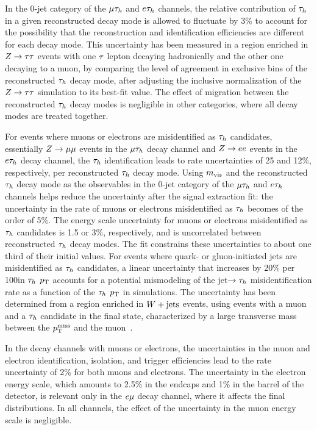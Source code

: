 In the 0-jet category of the $\mu\tau_{h}$ and $e\tau_{h}$ channels, the relative contribution of $\tau_{h}$ in a given
reconstructed decay mode is allowed to fluctuate by 3\% to account for the possibility that the reconstruction and
identification efficiencies are different for each decay mode. This uncertainty has been measured in a region enriched in $Z\to\tau\tau$ events with one $\tau$ lepton decaying hadronically and the other one decaying to a muon, by comparing the level of agreement in exclusive bins of the reconstructed $\tau_{h}$ decay mode, after adjusting the inclusive normalization of the $Z\to\tau\tau$ simulation to its best-fit value. The effect of migration between the reconstructed $\tau_{h}$ decay modes is negligible in other categories, where
all decay modes are treated together.

For events where muons or electrons are misidentified as $\tau_{h}$ candidates, essentially $Z\to \mu\mu$ events in the $\mu\tau_{h}$ decay channel and $Z\to ee$ events in the $e\tau_{h}$ decay channel, the $\tau_{h}$ identification leads to rate uncertainties of 25 and 12\%, respectively, per reconstructed $\tau_{h}$ decay mode. Using $m_\text{vis}$ and the reconstructed $\tau_{h}$ decay mode as the observables in the 0-jet category of the $\mu\tau_{h}$ and $e\tau_{h}$ channels helps reduce the uncertainty after the signal extraction fit: the uncertainty in the rate of muons or electrons misidentified as $\tau_{h}$ becomes of the order of 5\%. The energy scale uncertainty for muons or electrons
 misidentified as $\tau_{h}$ candidates is 1.5 or 3\%, respectively, and is uncorrelated between reconstructed $\tau_{h}$ decay
modes. The fit constrains these uncertainties to about one third of their initial values. For events where quark- or gluon-initiated jets are misidentified as $\tau_{h}$ candidates, a linear uncertainty that increases by 20\% per 100\GeV in $\tau_{h}$ $p_\mathrm{T}$ accounts for a potential mismodeling of the jet$\to\tau_{h}$ misidentification rate as a
function of the $\tau_{h}$ $p_\mathrm{T}$ in simulations. The uncertainty has been determined from a region enriched in $W+\text{jets}$ events, using events with a muon and a $\tau_{h}$ candidate in the final state, characterized by a large transverse mass between the $p_\mathrm{T}^\text{miss}$ and the muon~\cite{Khachatryan:2015dfa,CMS-PAS-TAU-16-002}.

In the decay channels with muons or electrons, the uncertainties in the muon and electron identification, isolation, and trigger efficiencies lead to the rate uncertainty of 2\% for both muons and electrons.
The uncertainty in the electron energy scale, which amounts to 2.5\% in the endcaps and 1\% in the barrel of the detector, is relevant only in the $e\mu$ decay channel, where it affects the final distributions.
In all channels, the effect of the uncertainty in
the muon energy scale is negligible.


